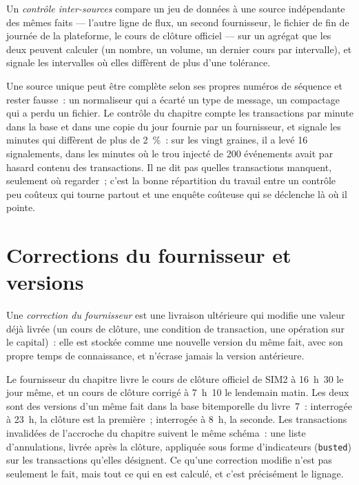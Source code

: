 \begin{definition}\label{def:pl:data-quality-and-lineage:cross}
Un \emph{contrôle inter-sources} compare un jeu de données à une source indépendante des mêmes faits ---
l'autre ligne de flux, un second fournisseur, le fichier de fin de journée de la plateforme, le cours de clôture officiel --- sur un agrégat que les deux peuvent calculer (un nombre, un
volume, un dernier cours par intervalle), et signale les intervalles où elles diffèrent de plus d'une tolérance.
\end{definition}

Une source unique peut être complète selon ses propres numéros de séquence et rester fausse~: un normaliseur qui a écarté un type de message, un
compactage qui a perdu un fichier. Le contrôle du chapitre compte les transactions par minute dans la base et dans une copie du jour fournie par un fournisseur, et signale
les minutes qui diffèrent de plus de 2~\%~: sur les vingt graines, il a levé 16 signalements, dans les minutes où le trou injecté de 200 événements
avait par hasard contenu des transactions. Il ne dit pas quelles transactions manquent, seulement où regarder~; c'est la bonne répartition du travail
entre un contrôle peu coûteux qui tourne partout et une enquête coûteuse qui se déclenche là où il pointe.

\section{Corrections du fournisseur et versions}

\begin{definition}\label{def:pl:data-quality-and-lineage:correction}
Une \emph{correction du fournisseur} est une livraison ultérieure qui modifie une valeur déjà livrée (un cours de clôture, une
condition de transaction, une opération sur le capital)~: elle est stockée comme une nouvelle version du même fait, avec son propre temps de connaissance, et n'écrase jamais
la version antérieure.
\end{definition}

Le fournisseur du chapitre livre le cours de clôture officiel de SIM2 à 16~h~30 le jour même, et un cours de clôture corrigé à 7~h~10 le lendemain matin. Les deux sont
des versions d'un même fait dans la base bitemporelle du livre~7~: interrogée à 23~h, la clôture est la première~; interrogée à 8~h, la seconde. Les
transactions invalidées de l'accroche du chapitre suivent le même schéma~: une liste d'annulations, livrée après la clôture, appliquée sous forme d'indicateurs (\texttt{busted}) sur les
transactions qu'elles désignent. Ce qu'une correction modifie n'est pas seulement le fait, mais tout ce qui en est calculé, et c'est précisément le lignage.


